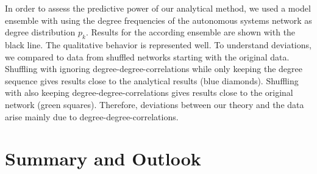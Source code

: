 \documentclass[aps, pre, twocolumn, a4paper, superscriptaddress, floatfix]{revtex4}
\begin{document}
In order to assess the predictive power of our analytical method, we used a model ensemble with 
using the degree frequencies of the autonomous systems network as degree distribution $p_k$. 
Results for the according ensemble are shown with the black line. The qualitative 
behavior is represented well. To understand deviations, we compared to data from shuffled networks 
starting with the original data. Shuffling with ignoring degree-degree-correlations while only 
keeping the degree sequence gives results close to the analytical results (blue diamonds). 
Shuffling with also keeping degree-degree-correlations gives results close to the original network 
(green squares). 
Therefore, deviations between our theory and the data arise mainly due to degree-degree-correlations. 












\section{Summary and Outlook}










\end{document}
